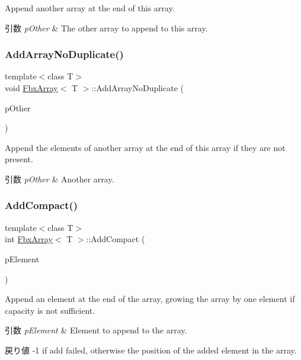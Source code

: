 Append another array at the end of this array. 
\begin{DoxyParams}{引数}
{\em p\+Other} & The other array to append to this array. \\
\hline
\end{DoxyParams}
\mbox{\label{class_fbx_array_a12a12c9c36c424bd880ae0f716d5efe7}} 
\subsubsection{\texorpdfstring{Add\+Array\+No\+Duplicate()}{AddArrayNoDuplicate()}}
{\footnotesize\ttfamily template$<$class T$>$ \\
void \hyperlink{class_fbx_array}{Fbx\+Array}$<$ T $>$\+::Add\+Array\+No\+Duplicate (\begin{DoxyParamCaption}\item[{const \hyperlink{class_fbx_array}{Fbx\+Array}$<$ T $>$ \&}]{p\+Other }\end{DoxyParamCaption})}

Append the elements of another array at the end of this array if they are not present. 
\begin{DoxyParams}{引数}
{\em p\+Other} & Another array. \\
\hline
\end{DoxyParams}
\mbox{\label{class_fbx_array_a7d59d8f9f24a1cc2092aac057bb12213}} 
\subsubsection{\texorpdfstring{Add\+Compact()}{AddCompact()}}
{\footnotesize\ttfamily template$<$class T$>$ \\
int \hyperlink{class_fbx_array}{Fbx\+Array}$<$ T $>$\+::Add\+Compact (\begin{DoxyParamCaption}\item[{const T \&}]{p\+Element }\end{DoxyParamCaption})}

Append an element at the end of the array, growing the array by one element if capacity is not sufficient. 
\begin{DoxyParams}{引数}
{\em p\+Element} & Element to append to the array. \\
\hline
\end{DoxyParams}
\begin{DoxyReturn}{戻り値}
-\/1 if add failed, otherwise the position of the added element in the array. 
\end{DoxyReturn}
\mbox{\label{class_fbx_array_a30f56716ede895f07b7b6ed59a889623}} 
